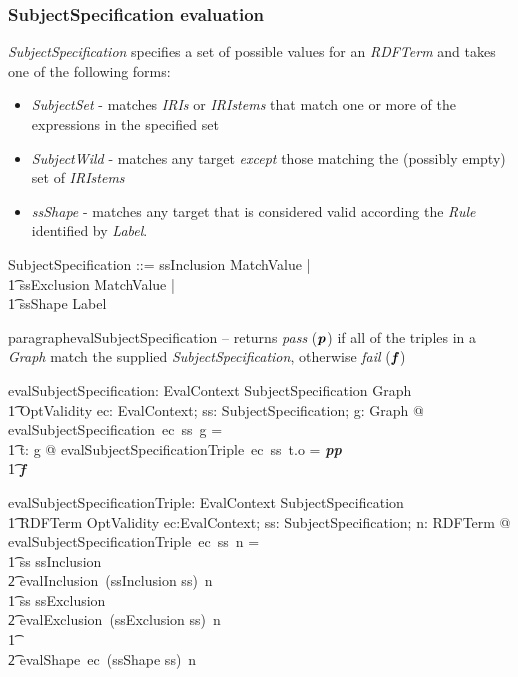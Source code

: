 \documentclass[fuzz]{llncs}
\def\entryFor{\cdot}
\def\pass{\textbf{\textit{p}}}
\def\fail{\textbf{\textit{f}}}
\def\zc{\textit}
\begin{document}
\subsubsection{SubjectSpecification evaluation}
\zc{SubjectSpecification} specifies a set of possible values for an \zc{RDFTerm} and takes one of the following forms:
\begin{itemize}
\item \zc{SubjectSet} - matches \zc{IRIs} or \zc{IRIstems} that match one or more of the expressions in the specified set
\item \zc{SubjectWild} - matches any target \emph{except} those matching the (possibly empty) set of \zc{IRIstems}
\item \zc{ssShape} - matches any target that is considered valid according the \zc{Rule} identified by \zc{Label}.
\end{itemize}
\begin{zed}
SubjectSpecification ::=  ssInclusion \ldata \power MatchValue \rdata | \\
\t1 ssExclusion \ldata \power MatchValue \rdata | \\
\t1 ssShape \ldata Label \rdata
\end{zed}

paragraph{evalSubjectSpecification} -- returns \zc{pass} ($\pass$) if all of the triples in a \zc{Graph} 
match the supplied \zc{SubjectSpecification}, otherwise \zc{fail} ($\fail$)
\begin{gendef}
   evalSubjectSpecification: EvalContext \fun SubjectSpecification \fun Graph \fun \\
\t1 OptValidity
\where
   \forall ec: EvalContext; ss: SubjectSpecification; g: Graph @ \\ evalSubjectSpecification~ec~ss~g = \\
\t1 \IF \forall t: g @ evalSubjectSpecificationTriple~ec~ss~t.o = \pass \THEN \pass \\
\t1 \ELSE \fail
\end{gendef}
\begin{gendef}
   evalSubjectSpecificationTriple: EvalContext \fun SubjectSpecification \fun \\
\t1 RDFTerm \fun OptValidity
\where
   \forall ec:EvalContext; ss: SubjectSpecification; n: RDFTerm @ \\
  evalSubjectSpecificationTriple~ec~ss~n = \\
\t1 \IF ss \in \ran ssInclusion \THEN \\
\t2 evalInclusion~(ssInclusion \entryFor ss)~n \\
\t1 \ELSE \IF ss \in \ran ssExclusion \THEN \\
\t2 evalExclusion~(ssExclusion \entryFor ss)~n \\
\t1 \ELSE \\
\t2 evalShape~ec~(ssShape \entryFor ss)~n
\end{gendef}
\end{document}

